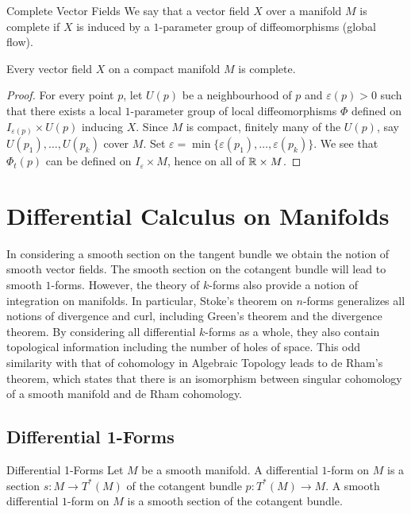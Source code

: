 \documentclass[a4paper]{article}
\begin{document}
\begin{defn}{Complete Vector Fields}{} We say that a vector field $X$ over a manifold $M$ is complete if $X$ is induced by a $1$-parameter group of diffeomorphisms (global flow). 
\end{defn}

\begin{prp}{}{} Every vector field $X$ on a compact manifold $M$ is complete. \tcbline
\begin{proof}
For every point $p$, let $U(p)$ be a neighbourhood of $p$ and $\varepsilon(p)>0$ such that there exists a local $1$-parameter group of local diffeomorphisms $\Phi$ defined on $I_{\varepsilon(p)}\times U(p)$ inducing $X$. Since $M$ is compact, finitely many of the $U(p)$, say $U(p_1),\dots,U(p_k)$ cover $M$. Set $\varepsilon=\min\{\varepsilon(p_1),\dots,\varepsilon(p_k)\}$. We see that $\Phi_t(p)$ can be defined on $I_\varepsilon\times M$, hence on all of $\mathbb{R}\times M$. 
\end{proof}
\end{prp}

\pagebreak
\section{Differential Calculus on Manifolds}
In considering a smooth section on the tangent bundle we obtain the notion of smooth vector fields. The smooth section on the cotangent bundle will lead to smooth $1$-forms. However, the theory of $k$-forms also provide a notion of integration on manifolds. In particular, Stoke's theorem on $n$-forms generalizes all notions of divergence and curl, including Green's theorem and the divergence theorem. By considering all differential $k$-forms as a whole, they also contain topological information including the number of holes of space. This odd similarity with that of cohomology in Algebraic Topology leads to de Rham's theorem, which states that there is an isomorphism between singular cohomology of a smooth manifold and de Rham cohomology. 

\subsection{Differential 1-Forms}
\begin{defn}{Differential 1-Forms}{} Let $M$ be a smooth manifold. A differential $1$-form on $M$ is a section $s:M\to T^\ast(M)$ of the cotangent bundle $p:T^\ast(M)\to M$. A smooth differential $1$-form on $M$ is a smooth section of the cotangent bundle. 
\end{defn}
\end{document}
